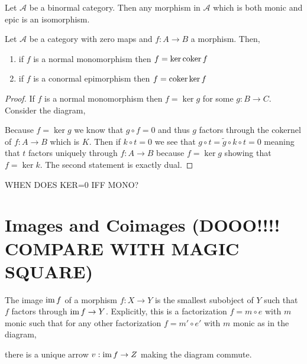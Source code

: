 \documentclass[12pt]{article}
\newcommand{\A}{\mathcal{A}}
\begin{document}
\begin{corollary}
Let $\A$ be a binormal category. Then any morphism in $\A$ which is both monic and epic is an isomorphism. 
\end{corollary}

\begin{prop}
Let $\A$ be a category with zero maps and $f : A \to B$ a morphism. Then,
\begin{enumerate}
\item if $f$ is a normal monomorphism then $f = \ker{\operatorname{\mathrm{coker}}{f}}$
\item if $f$ is a conormal epimorphism then $f = \operatorname{\mathrm{coker}}{\ker{f}}$
\end{enumerate}
\end{prop}

\begin{proof}
If $f$ is a normal monomorphism then $f = \ker{g}$ for some $g : B \to C$. Consider the diagram,
\begin{center}
\end{center}
Because $f = \ker{g}$ we know that $g \circ f = 0$ and thus $g$ factors through the cokernel of $f : A \to B$ which is $K$. Then if $k \circ t = 0$ we see that $g \circ t = \tilde{g} \circ k \circ t = 0$ meaning that $t$ factors uniquely through $f : A \to B$ because $f = \ker{g}$ showing that $f = \ker{k}$. The second statement is exactly dual.
\end{proof}

WHEN DOES KER=0 IFF MONO?

\section{Images and Coimages (DOOO!!!! COMPARE WITH MAGIC SQUARE)}

\begin{defn}
The image $\operatorname{\mathrm{im}}{f}$ of a morphism $f : X \to Y$ is the smallest subobject of $Y$ such that $f$ factors through $\operatorname{\mathrm{im}}{f} \to Y$. Explicitly, this is a factorization $f = m \circ e$ with $m$ monic such that for any other factorization $f = m' \circ e'$ with $m$ monic as in the diagram,
\begin{center}
\end{center}
there is a unique arrow $v : \operatorname{\mathrm{im}}{f} \to Z$ making the diagram commute.
\end{defn}
\end{document}
